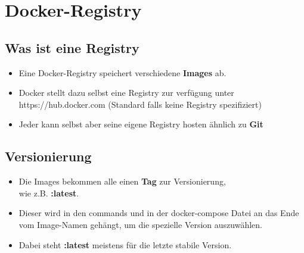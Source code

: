 \section{Docker-Registry}\label{sec:docker-registry}
\subsection{Was ist eine Registry}

\begin{frame}
    \slidehead
    \Large
    \centering
    \vspace{-2pt}
    \begin{itemize}[<+->]
        \item Eine Docker-Registry speichert verschiedene \textbf{Images} ab.
        \item Docker stellt dazu selbst eine Registry zur verfügung unter \\
              https://hub.docker.com (Standard falls keine Registry spezifiziert)
        \item Jeder kann selbst aber seine eigene Registry hosten ähnlich zu \textbf{Git}
    \end{itemize}
    \normalsize
\end{frame}

\subsection{Versionierung}

\begin{frame}
    \slidehead
    \Large
    \begin{itemize}[<+->]
        \item Die Images bekommen alle einen \textbf{Tag} zur Versionierung, \\
              wie z.B. \textbf{:latest}.
        \item Dieser wird in den commands und in der docker-compose Datei an das Ende vom Image-Namen gehängt,
              um die spezielle Version auszuwählen.
        \item Dabei steht \textbf{:latest} meistens für die letzte stabile Version.
    \end{itemize}
\end{frame}


